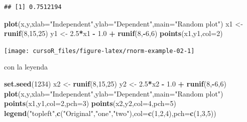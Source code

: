 \documentclass[]{book}
\newenvironment{Shaded}{\begin{snugshade}}{\end{snugshade}}
\newcommand{\KeywordTok}[1]{\textcolor[rgb]{0.13,0.29,0.53}{\textbf{#1}}}
\newcommand{\DataTypeTok}[1]{\textcolor[rgb]{0.13,0.29,0.53}{#1}}
\newcommand{\DecValTok}[1]{\textcolor[rgb]{0.00,0.00,0.81}{#1}}
\newcommand{\FloatTok}[1]{\textcolor[rgb]{0.00,0.00,0.81}{#1}}
\newcommand{\StringTok}[1]{\textcolor[rgb]{0.31,0.60,0.02}{#1}}
\newcommand{\OperatorTok}[1]{\textcolor[rgb]{0.81,0.36,0.00}{\textbf{#1}}}
\newcommand{\NormalTok}[1]{#1}
\begin{document}
\begin{verbatim}
## [1] 0.7512194
\end{verbatim}

\begin{Shaded}
\begin{Highlighting}[]
 \KeywordTok{plot}\NormalTok{(x,y,}\DataTypeTok{xlab=}\StringTok{"Independent"}\NormalTok{,}\DataTypeTok{ylab=}\StringTok{"Dependent"}\NormalTok{,}\DataTypeTok{main=}\StringTok{"Random plot"}\NormalTok{)}
\NormalTok{ x1 <-}\StringTok{ }\KeywordTok{runif}\NormalTok{(}\DecValTok{8}\NormalTok{,}\DecValTok{15}\NormalTok{,}\DecValTok{25}\NormalTok{)}
\NormalTok{ y1 <-}\StringTok{ }\FloatTok{2.5}\OperatorTok{*}\NormalTok{x1 }\OperatorTok{-}\StringTok{ }\FloatTok{1.0} \OperatorTok{+}\StringTok{ }\KeywordTok{runif}\NormalTok{(}\DecValTok{8}\NormalTok{,}\OperatorTok{-}\DecValTok{6}\NormalTok{,}\DecValTok{6}\NormalTok{)}
 \KeywordTok{points}\NormalTok{(x1,y1,}\DataTypeTok{col=}\DecValTok{2}\NormalTok{)}
\end{Highlighting}
\end{Shaded}

\begin{center}\texttt{[image: cursoR\_files/figure-latex/rnorm-example-02-1]} \end{center}

con la leyenda

\begin{Shaded}
\begin{Highlighting}[]
\KeywordTok{set.seed}\NormalTok{(}\DecValTok{1234}\NormalTok{)}
\NormalTok{x2 <-}\StringTok{ }\KeywordTok{runif}\NormalTok{(}\DecValTok{8}\NormalTok{,}\DecValTok{15}\NormalTok{,}\DecValTok{25}\NormalTok{)}
\NormalTok{y2 <-}\StringTok{ }\FloatTok{2.5}\OperatorTok{*}\NormalTok{x2 }\OperatorTok{-}\StringTok{ }\FloatTok{1.0} \OperatorTok{+}\StringTok{ }\KeywordTok{runif}\NormalTok{(}\DecValTok{8}\NormalTok{,}\OperatorTok{-}\DecValTok{6}\NormalTok{,}\DecValTok{6}\NormalTok{)}
 \KeywordTok{plot}\NormalTok{(x,y,}\DataTypeTok{xlab=}\StringTok{"Independent"}\NormalTok{,}\DataTypeTok{ylab=}\StringTok{"Dependent"}\NormalTok{,}\DataTypeTok{main=}\StringTok{"Random plot"}\NormalTok{)}
 \KeywordTok{points}\NormalTok{(x1,y1,}\DataTypeTok{col=}\DecValTok{2}\NormalTok{,}\DataTypeTok{pch=}\DecValTok{3}\NormalTok{)}
 \KeywordTok{points}\NormalTok{(x2,y2,}\DataTypeTok{col=}\DecValTok{4}\NormalTok{,}\DataTypeTok{pch=}\DecValTok{5}\NormalTok{)}
 \KeywordTok{legend}\NormalTok{(}\StringTok{"topleft"}\NormalTok{,}\KeywordTok{c}\NormalTok{(}\StringTok{"Original"}\NormalTok{,}\StringTok{"one"}\NormalTok{,}\StringTok{"two"}\NormalTok{),}\DataTypeTok{col=}\KeywordTok{c}\NormalTok{(}\DecValTok{1}\NormalTok{,}\DecValTok{2}\NormalTok{,}\DecValTok{4}\NormalTok{),}\DataTypeTok{pch=}\KeywordTok{c}\NormalTok{(}\DecValTok{1}\NormalTok{,}\DecValTok{3}\NormalTok{,}\DecValTok{5}\NormalTok{))}
\end{Highlighting}
\end{Shaded}
\end{document}

